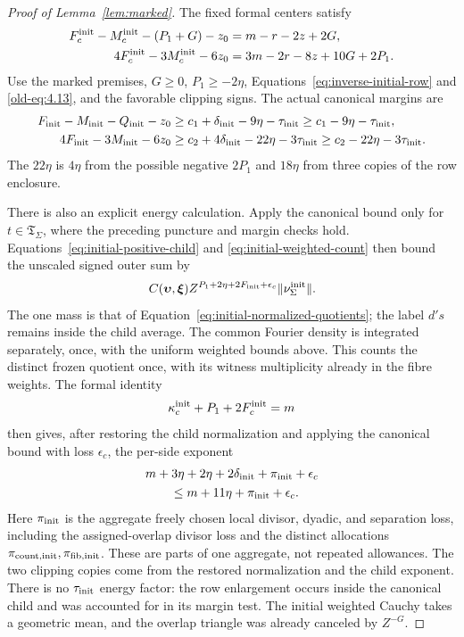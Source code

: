 \documentclass[11pt,a4paper]{article}
\numberwithin{equation}{section}
\numberwithin{figure}{section}
\theoremstyle{definition}
\theoremstyle{remark}
\begin{document}
\begin{proof}[Proof of Lemma~\ref{lem:marked}]
The fixed formal centers satisfy
\[
 \begin{aligned}
 F_c^{\rm init}-M_c^{\rm init}-(P_1+G)-z_0&=m-r-2z+2G,\\
 4F_c^{\rm init}-3M_c^{\rm init}-6z_0&=3m-2r-8z+10G+2P_1.
 \end{aligned}
\]
Use the marked premises, \(G\ge0\), \(P_1\ge-2\eta\),
Equations~\eqref{eq:inverse-initial-row} and \eqref{old-eq:4.13}, and
the favorable clipping signs.  The actual canonical margins are
\begin{equation}\label{eq:inverse-initial-margins}
 \begin{aligned}
 F_{\rm init}-M_{\rm init}-Q_{\rm init}-z_0
   &\ge c_1+\delta_{\rm init}-9\eta-\tau_{\rm init}
     \ge c_1-9\eta-\tau_{\rm init},\\
 4F_{\rm init}-3M_{\rm init}-6z_0
   &\ge c_2+4\delta_{\rm init}-22\eta-3\tau_{\rm init}
     \ge c_2-22\eta-3\tau_{\rm init}.
 \end{aligned}
\end{equation}
The \(22\eta\) is \(4\eta\) from the possible negative \(2P_1\) and
\(18\eta\) from three copies of the row enclosure.

There is also an explicit energy calculation.  Apply the canonical
bound only for \(t\in\mathfrak T_\Sigma\), where the preceding puncture
and margin checks hold.  Equations~\eqref{eq:initial-positive-child}
and \eqref{eq:initial-weighted-count} then bound the unscaled signed
outer sum by
\[
 C(\boldsymbol\upsilon,\boldsymbol\xi)
 Z^{P_1+2\eta+2F_{\rm init}+\epsilon_c}
 \|\nu_\Sigma^{\rm init}\|.
\]
The one mass is that of Equation~\eqref{eq:initial-normalized-quotients};
the label \(d's\) remains inside the child average.  The common
Fourier density is integrated separately, once, with the uniform
weighted bounds above.  This counts the distinct frozen quotient
once, with its witness multiplicity already in the fibre weights.
The formal identity
\[
 \kappa_c^{\rm init}+P_1+2F_c^{\rm init}=m
\]
then gives, after restoring the child normalization and applying the
canonical bound with loss \(\epsilon_c\), the per-side exponent
\begin{equation}\label{eq:inverse-initial-energy}
 \begin{split}
 &m+3\eta+2\eta+2\delta_{\rm init}+\pi_{\rm init}+\epsilon_c\\
 &\qquad\le m+11\eta+\pi_{\rm init}+\epsilon_c.
 \end{split}
\end{equation}
Here \(\pi_{\rm init}\) is the aggregate freely chosen local divisor,
dyadic, and separation loss, including the assigned-overlap divisor
loss and the distinct allocations
\(\pi_{{\rm count},{\rm init}},\pi_{{\rm fib},{\rm init}}\).
These are parts of one aggregate, not repeated allowances.
The two clipping copies come from the restored normalization and
the child exponent.  There is no \(\tau_{\rm init}\) energy factor: the
row enlargement occurs inside the canonical child and was accounted for
in its margin test.  The initial weighted Cauchy takes a geometric mean,
and the overlap triangle was already canceled by \(Z^{-G}\).


\end{proof}
\end{document}

